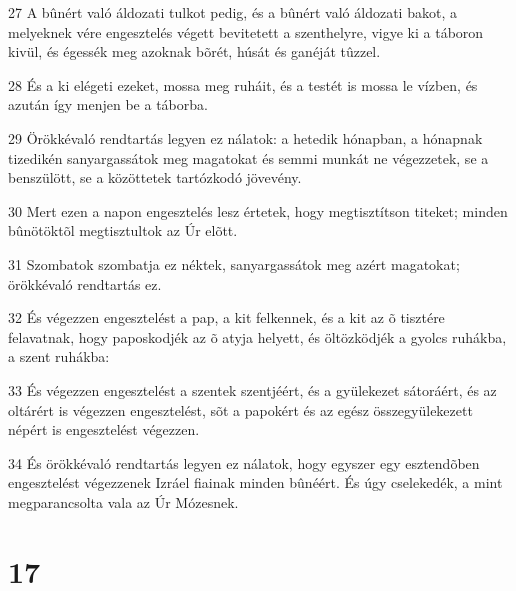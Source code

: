 \par 27 A bûnért való áldozati tulkot pedig, és a bûnért való áldozati bakot, a melyeknek vére engesztelés végett bevitetett a szenthelyre, vigye ki a táboron kivül, és égessék meg azoknak bõrét, húsát és ganéját tûzzel.
\par 28 És a ki elégeti ezeket, mossa meg ruháit, és a testét is mossa le vízben, és azután így menjen be a táborba.
\par 29 Örökkévaló rendtartás legyen ez nálatok: a hetedik hónapban, a hónapnak tizedikén sanyargassátok meg magatokat és semmi munkát ne végezzetek, se a benszülött, se a közöttetek tartózkodó jövevény.
\par 30 Mert ezen a napon engesztelés lesz értetek, hogy megtisztítson titeket; minden bûnötöktõl megtisztultok az Úr elõtt.
\par 31 Szombatok szombatja ez néktek, sanyargassátok meg azért magatokat; örökkévaló rendtartás ez.
\par 32 És végezzen engesztelést a pap, a kit felkennek, és a kit az õ tisztére felavatnak, hogy paposkodjék az õ atyja helyett, és öltözködjék a gyolcs ruhákba, a szent ruhákba:
\par 33 És végezzen engesztelést a szentek szentjéért, és a gyülekezet sátoráért, és az oltárért is végezzen engesztelést, sõt a papokért és az egész összegyülekezett népért is engesztelést végezzen.
\par 34 És örökkévaló rendtartás legyen ez nálatok, hogy egyszer egy esztendõben engesztelést végezzenek Izráel fiainak minden bûnéért. És úgy cselekedék, a mint megparancsolta vala az Úr Mózesnek.

\chapter{17}

